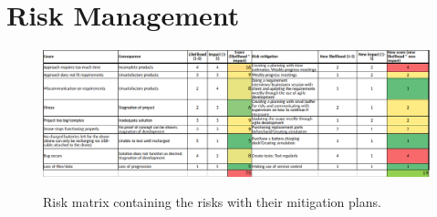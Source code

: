 \chapter{Risk Management}
\label{app:risks}

\begin{figure}[h]
	\centering
	\includegraphics[width=\linewidth, angle=-90]{img/risk_matrix_post_midterm}
	\label{fig:risk_matrix}
	\caption{Risk matrix containing the risks with their mitigation plans.}
\end{figure}

